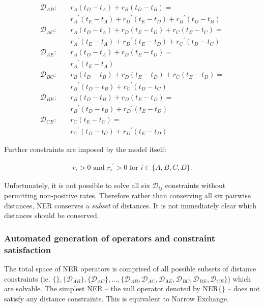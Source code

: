 \documentclass[10pt,letterpaper]{article}
\begin{document}
\begin{align}
	\mathcal{D}_{AB}: \quad & r_A  (t_D - t_A) + r_B  (t_D - t_B) = \nonumber \\
					 & {r_A}^\prime  (t_E - t_A) + {r_D}^\prime  (t_E - t_D) + {r_B}^\prime (t_D - t_B) \\
	\mathcal{D}_{AC}: \quad & r_A  (t_D - t_A) + r_D  (t_E - t_D) + r_C  (t_E - t_C) = \nonumber \\
				 	  & {r_A}^\prime  (t_E - t_A) + {r_D}^\prime  (t_E - t_D) + {r_C}^\prime (t_D - t_C) \\
 	\mathcal{D}_{AE}: \quad & r_A  (t_D - t_A) + r_D  (t_E - t_D)= \nonumber \\
					  & {r_A}^\prime  (t_E - t_A) \\
  	\mathcal{D}_{BC}: \quad & r_B  (t_D - t_B) + r_D  (t_E - t_D) + r_C  (t_E - t_D)= \nonumber \\
					  & {r_B}^\prime (t_D - t_B) + {r_C}^\prime (t_D - t_C) \\
   	\mathcal{D}_{BE}: \quad & r_B  (t_D - t_B) + r_D  (t_E - t_D)= \nonumber \\
					  & {r_B}^\prime (t_D - t_B) + {r_D}^\prime (t_E - t_D) \\
	\mathcal{D}_{CE}: \quad & r_C  (t_E - t_C)= \nonumber \\
					  & {r_C}^\prime (t_D - t_C) + {r_D}^\prime (t_E - t_D) 
\end{align}


Further constraints are imposed by the model itself:


\begin{align}
	r_i > 0 \text{ and } {r_i}^\prime > 0 \text { for } i \in \{A,B,C,D\}.
\end{align}



Unfortunately, it is not possible to solve all six $\mathcal{D}_{ij}$ constraints without permitting non-positive rates. Therefore rather than conserving all six pairwise distances, NER conserves a \textit{subset} of distances. It is not immediately clear which distances should be conserved. 


\subsubsection*{Automated generation of operators and constraint satisfaction}


The total space of NER operators is comprised of all possible subsets of distance constraints (ie. $\{\},\{\mathcal{D}_{AB}\}, \{\mathcal{D}_{AC}\}, \dotso , \{\mathcal{D}_{AB}, \mathcal{D}_{AC}, \mathcal{D}_{AE}, \mathcal{D}_{BC}, \mathcal{D}_{BE}, \mathcal{D}_{CE} \}$) which are solvable. The simplest NER -- the null operator denoted by NER$\{\}$ -- does not satisfy any distance constraints. This is equivalent to Narrow Exchange. 
\end{document}
